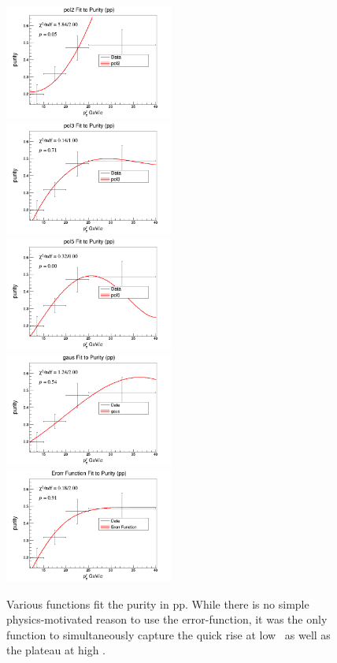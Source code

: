 \begin{figure}
    \centering
    \includegraphics[width=0.495\textwidth]{Checks_Systematics/Pol2}
    \includegraphics[width=0.495\textwidth]{Checks_Systematics/pol3}
    \includegraphics[width=0.495\textwidth]{Checks_Systematics/pol5}
    \includegraphics[width=0.495\textwidth]{Checks_Systematics/gauss}
    \includegraphics[width=0.495\textwidth]{Checks_Systematics/EF_Fit}
    \caption{Various functions fit the purity in pp. While there is no simple physics-motivated reason to use the error-function, it was the only function to simultaneously capture the quick rise at low \pt~as well as the plateau at high \pt.}
    \label{Fig:Fit_variations}
\end{figure}

